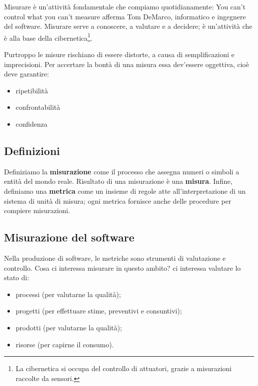 \documentclass[a4paper]{article}
\begin{document}
		
Misurare è un'attività fondamentale che compiamo quotidianamente: You can't control what you can't measure afferma Tom DeMarco, informatico e ingegnere del software. Misurare serve a conoscere, a valutare e a decidere; è un'attività che è alla base della cibernetica\footnote{La cibernetica si occupa del controllo di attuatori, grazie a misurazioni raccolte da sensori.}.
		
Purtroppo le misure rischiano di essere distorte, a causa di semplificazioni e imprecisioni. Per accertare la bontà di una misura essa dev'essere oggettiva, cioè deve garantire:
		
	\begin{itemize}
		
			
	\item ripetibilità
			
	\item confrontabilità
			
	\item confidenza
		
	\end{itemize}


		
	\subsection{Definizioni}

		
Definiziamo la \textbf{misurazione} come il processo che assegna numeri o simboli a entità del mondo reale. Risultato di una misurazione è una \textbf{misura}. Infine, definiamo una \textbf{metrica} come un insieme di regole atte all'interpretazione di un sistema di unità di misura; ogni metrica fornisce anche delle procedure per compiere misurazioni.

		
	\subsection{Misurazione del software}

		
Nella produzione di software, le metriche sono strumenti di valutazione e controllo. Cosa ci interessa misurare in questo ambito? ci interessa valutare lo stato di:
		
	\begin{itemize}
		
			
	\item processi (per valutarne la qualità);
			
	\item progetti (per effettuare stime, preventivi e consuntivi);
			
	\item prodotti (per valutarne la qualità);
			
	\item risorse (per capirne il consumo).
		
	\end{itemize}
\end{document}
